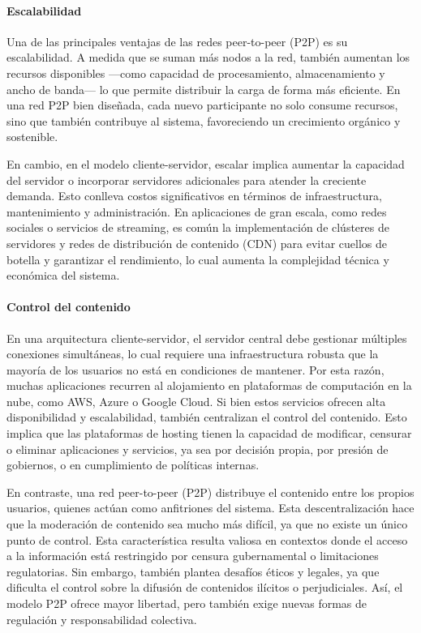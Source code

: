 \paragraph{Escalabilidad}

Una de las principales ventajas de las redes peer-to-peer (P2P) es su escalabilidad. A medida que se suman más nodos a la red, también aumentan los recursos disponibles —como capacidad de procesamiento, almacenamiento y ancho de banda— lo que permite distribuir la carga de forma más eficiente. En una red P2P bien diseñada, cada nuevo participante no solo consume recursos, sino que también contribuye al sistema, favoreciendo un crecimiento orgánico y sostenible.

En cambio, en el modelo cliente-servidor, escalar implica aumentar la capacidad del servidor o incorporar servidores adicionales para atender la creciente demanda. Esto conlleva costos significativos en términos de infraestructura, mantenimiento y administración. En aplicaciones de gran escala, como redes sociales o servicios de streaming, es común la implementación de clústeres de servidores y redes de distribución de contenido (CDN) para evitar cuellos de botella y garantizar el rendimiento, lo cual aumenta la complejidad técnica y económica del sistema.

\paragraph{Control del contenido}

En una arquitectura cliente-servidor, el servidor central debe gestionar múltiples conexiones simultáneas, lo cual requiere una infraestructura robusta que la mayoría de los usuarios no está en condiciones de mantener. Por esta razón, muchas aplicaciones recurren al alojamiento en plataformas de computación en la nube, como AWS, Azure o Google Cloud. Si bien estos servicios ofrecen alta disponibilidad y escalabilidad, también centralizan el control del contenido. Esto implica que las plataformas de hosting tienen la capacidad de modificar, censurar o eliminar aplicaciones y servicios, ya sea por decisión propia, por presión de gobiernos, o en cumplimiento de políticas internas.

En contraste, una red peer-to-peer (P2P) distribuye el contenido entre los propios usuarios, quienes actúan como anfitriones del sistema. Esta descentralización hace que la moderación de contenido sea mucho más difícil, ya que no existe un único punto de control. Esta característica resulta valiosa en contextos donde el acceso a la información está restringido por censura gubernamental o limitaciones regulatorias. Sin embargo, también plantea desafíos éticos y legales, ya que dificulta el control sobre la difusión de contenidos ilícitos o perjudiciales. Así, el modelo P2P ofrece mayor libertad, pero también exige nuevas formas de regulación y responsabilidad colectiva.

